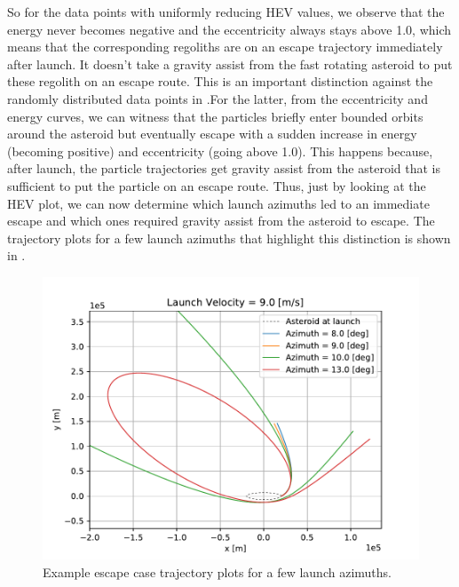 So for the data points with uniformly reducing \gls{HEV} values, we observe that the energy never becomes negative and the eccentricity always stays above 1.0, which means that the corresponding regoliths are on an escape trajectory immediately after launch. It doesn't take a gravity assist from the fast rotating asteroid to put these regolith on an escape route. This is an important distinction against the randomly distributed data points in .For the latter, from the eccentricity and energy curves, we can witness that the particles briefly enter bounded orbits around the asteroid but eventually escape with a sudden increase in energy (becoming positive) and eccentricity (going above 1.0). This happens because, after launch, the particle trajectories get gravity assist from the asteroid that is sufficient to put the particle on an escape route. Thus, just by looking at the \gls{HEV} plot, we can now determine which launch azimuths led to an immediate escape and which ones required gravity assist from the asteroid to escape. The trajectory plots for a few launch azimuths that highlight this distinction is shown in .
\begin{figure}[htb]
\centering
\captionsetup{justification=centering}
\includegraphics[width=\textwidth, height=0.32\textheight, keepaspectratio=true]{Images/longest_edge_no_perturbations/9ms_escape_example_trajectories.pdf}
\caption{Example escape case trajectory plots for a few launch azimuths.}
\label{fig:escape_example_traj_9ms_noSP}
\end{figure}
\FloatBarrier
